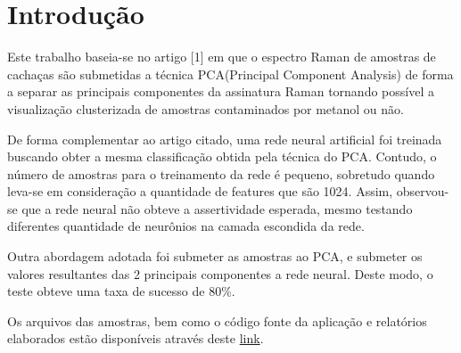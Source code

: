 \documentclass{article}
\begin{document}
\pagestyle{empty} 
\sloppy
{}

\begin{abstract}
O presente trabalho valida a utilização de redes neurais artificiais na interpretação de dados do espectro Raman de amostras de cachaça. Combinando a modelagem a técnica PCA(Principal Component Analysis) de forma a maximizar a taxa de sucesso obtida. \vspace{2cm}
\end{abstract}

\section{Introdução}
\vspace{1cm} 
Este trabalho baseia-se no artigo [1] em que o espectro Raman de amostras de cachaças são submetidas a técnica PCA(Principal Component Analysis) de forma a separar as principais componentes da assinatura Raman tornando possível a visualização clusterizada de amostras contaminados por metanol ou não.

De forma complementar ao artigo citado, uma rede neural artificial foi treinada buscando obter a mesma classificação obtida pela técnica do PCA. Contudo, o número de amostras para o treinamento da rede é pequeno, sobretudo quando leva-se em consideração a quantidade de features que são 1024. Assim, observou-se que a rede neural não obteve a assertividade esperada, mesmo testando diferentes quantidade de neurônios na camada escondida da rede.

Outra abordagem adotada foi submeter as amostras ao PCA, e submeter os valores resultantes das 2 principais componentes a rede neural. Deste modo, o teste obteve uma taxa de sucesso de 80\%.

Os arquivos das amostras, bem como o código fonte da aplicação e relatórios elaborados estão disponíveis através deste \href{https://github.com/danielscosta/mestrado/tree/master/disciplinas/Inteligencia_Artificial/projeto}{link}.
\end{document}
